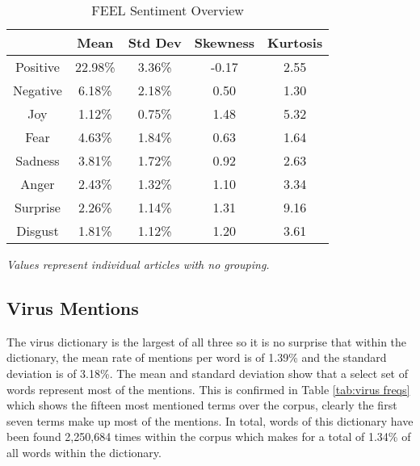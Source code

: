 \begin{table}[H]
\centering
\begin{tabular}{@{}ccccc@{}}
\toprule
         & Mean    & Std Dev & Skewness & Kurtosis \\ \midrule
Positive & 22.98\% & 3.36\%  & -0.17  & 2.55   \\
Negative & 6.18\%  & 2.18\%  & 0.50   & 1.30   \\
Joy      & 1.12\%  & 0.75\%  & 1.48   & 5.32   \\
Fear     & 4.63\%  & 1.84\%  & 0.63   & 1.64   \\
Sadness  & 3.81\%  & 1.72\%  & 0.92   & 2.63   \\
Anger    & 2.43\%  & 1.32\%  & 1.10   & 3.34   \\
Surprise & 2.26\%  & 1.14\%  & 1.31   & 9.16   \\
Disgust  & 1.81\%  & 1.12\%  & 1.20   & 3.61   \\
\bottomrule
\end{tabular}
\caption{FEEL Sentiment Overview}
\label{tab:feel stats}
\emph{Values represent individual articles with no grouping.}
\end{table}

\subsection{Virus Mentions}

The virus dictionary is the largest of all three so it is no surprise that within the dictionary, the mean rate of mentions per word is of 1.39\% and the standard deviation is of 3.18\%. The mean and standard deviation show that a select set of words represent most of the mentions. This is confirmed in Table \ref{tab:virus freqs} which shows the fifteen most mentioned terms over the corpus, clearly the first seven terms make up most of the mentions. In total, words of this dictionary have been found 2,250,684 times within the corpus which makes for a total of 1.34\% of all words within the dictionary.

